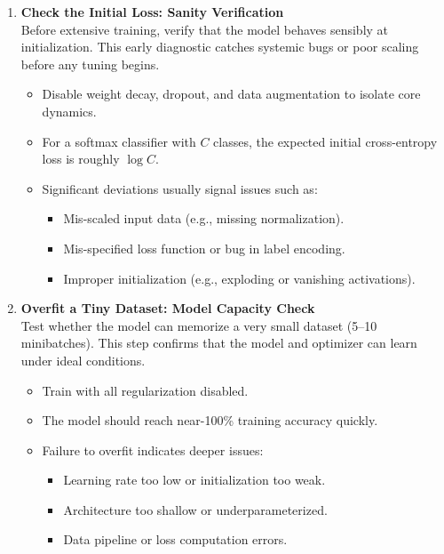 \begin{enumerate}
	\item \textbf{Check the Initial Loss: Sanity Verification}\\
	Before extensive training, verify that the model behaves sensibly at initialization.  
	This early diagnostic catches systemic bugs or poor scaling before any tuning begins.
	\begin{itemize}
		\item Disable weight decay, dropout, and data augmentation to isolate core dynamics.
		\item For a softmax classifier with \( C \) classes, the expected initial cross-entropy loss is roughly \( \log C \).
		\item Significant deviations usually signal issues such as:
		\begin{itemize}
			\item Mis-scaled input data (e.g., missing normalization).
			\item Mis-specified loss function or bug in label encoding.
			\item Improper initialization (e.g., exploding or vanishing activations).
		\end{itemize}
	\end{itemize}
	
	\item \textbf{Overfit a Tiny Dataset: Model Capacity Check}\\
	Test whether the model can memorize a very small dataset (5–10 minibatches).  
	This step confirms that the model and optimizer can learn under ideal conditions.
	\begin{itemize}
		\item Train with all regularization disabled.
		\item The model should reach near-100\% training accuracy quickly.
		\item Failure to overfit indicates deeper issues:
		\begin{itemize}
			\item Learning rate too low or initialization too weak.
			\item Architecture too shallow or underparameterized.
			\item Data pipeline or loss computation errors.
		\end{itemize}
	\end{itemize}
	

\end{enumerate}
